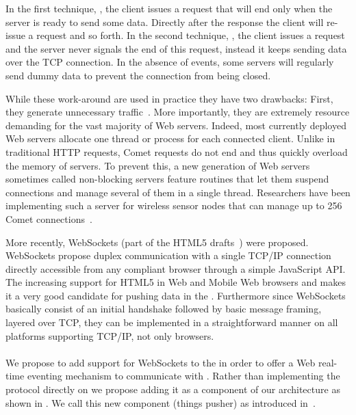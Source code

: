 In the first technique, , the client issues a request that will end only when the server is ready to send some data. Directly after the response the client will re-issue a request and so forth. In the second technique, , the client issues a request and the server never signals the end of this request, instead it keeps sending data over the TCP connection. In the absence of events, some servers will regularly send dummy data to prevent the connection from being closed.
 
While these work-around are used in practice they have two drawbacks: First, they generate unnecessary traffic~\cite{Lubbers2010}. More importantly, they are extremely resource demanding for the vast majority of Web servers. Indeed, most currently deployed Web servers allocate one thread or process for each connected client. Unlike in traditional HTTP requests, Comet requests do not end and thus quickly overload the memory of servers. To prevent this, a new generation of Web servers sometimes called non-blocking servers feature routines that let them suspend connections and manage several of them in a single thread. Researchers have been implementing such a server for wireless sensor nodes that can manage up to 256 Comet connections~\cite{Duquennoy2009a}.

More recently, WebSockets (part of the HTML5 drafts~) were proposed. WebSockets propose duplex communication with a single TCP/IP connection directly accessible from any compliant browser through a simple JavaScript API. The increasing support for HTML5 in Web and Mobile Web browsers and makes it a very good candidate for pushing data in the \WoT{}. Furthermore since WebSockets basically consist of an initial handshake followed by basic message framing, layered over TCP, they can be implemented in a straightforward manner on all platforms supporting TCP/IP, not only browsers.

\paragraph{\tpusher{}}
We propose to add support for WebSockets to the \WoTA{} in order to offer a Web real-time eventing mechanism to communicate with \sts{}. Rather than implementing the protocol directly on \sts{} we propose adding it as a component of our \sg{} architecture as shown in . We call this new component \tpusher{} (things pusher) as introduced in~\cite{Guinard2011}.



